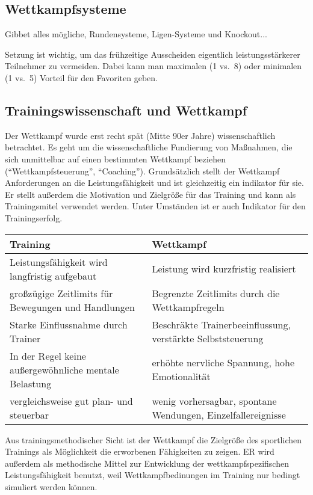\subsection{Wettkampfsysteme}

Gibbet alles mögliche, Rundensysteme, Ligen-Systeme und Knockout...

Setzung ist wichtig, um das frühzeitige Ausscheiden eigentlich leistungsstärkerer Teilnehmer zu vermeiden. Dabei kann man maximalen (1 vs.\ 8) oder minimalen (1 vs.\ 5) Vorteil für den Favoriten geben.

\subsection{Trainingswissenschaft und Wettkampf}

Der Wettkampf wurde erst recht spät (Mitte 90er Jahre) wissenschaftlich betrachtet. Es geht um die wissenschaftliche Fundierung von Maßnahmen, die sich unmittelbar auf einen bestimmten Wettkampf beziehen (``Wettkampfsteuerung'', ``Coaching''). Grundsätzlich stellt der Wettkampf Anforderungen an die Leistungsfähigkeit und ist gleichzeitig ein indikator für sie. Er stellt außerdem die Motivation und Zielgröße für das Training und kann als Trainingsmitel verwendet werden. Unter Umständen ist er auch Indikator für den Trainingserfolg.

\begin{tabular}{m{} | m{}}
    Training & Wettkampf \\ \hline
    Leistungsfähigkeit wird langfristig aufgebaut & Leistung wird kurzfristig realisiert \\
    großzügige Zeitlimits für Bewegungen und Handlungen & Begrenzte Zeitlimits durch die Wettkampfregeln \\ Starke Einflussnahme durch Trainer &  Beschräkte Trainerbeeinflussung, verstärkte  Selbststeuerung \\
    In der Regel keine außergewöhnliche mentale Belastung & erhöhte nervliche Spannung, hohe Emotionalität \\
    vergleichsweise gut plan- und steuerbar & wenig vorhersagbar, spontane Wendungen, Einzelfallereignisse \\
\end{tabular}

Aus trainingsmethodischer Sicht ist der Wettkampf die Zielgröße des sportlichen Trainings als Möglichkeit die erworbenen Fähigkeiten zu zeigen.
ER wird außerdem als methodische Mittel zur Entwicklung der wettkampfspezifischen Leistungsfähigkeit benutzt, weil Wettkampfbedinungen im Training nur bedingt simuliert werden können.

